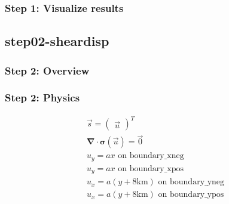 \documentclass[aspectratio=169]{beamer}
\begin{document}
\begin{frame}
  \frametitle{Step 1: Visualize results}

    
\end{frame}


\subsection{step02-sheardisp}

\begin{frame}
  \frametitle{Step 2: Overview}

      
\end{frame}


\begin{frame}[t]
  \frametitle{Step 2: Physics}
  \summary{}

  \begin{minipage}{0.35\textwidth}
    {\scriptsize
    \begin{gather*}
      \vec{s} = \left(\begin{array}{c} \vec{u} \end{array}\right)^T \\
      \boldsymbol{\nabla} \cdot \boldsymbol{\sigma}(\vec{u}) = \vec{0} \\
      u_y = ax \text{ on boundary\_xneg} \\
      u_y = ax \text{ on boundary\_xpos} \\
      u_x = a(y+8\mathrm{km}) \text{ on boundary\_yneg} \\
      u_x = a(y+8\mathrm{km}) \text{ on boundary\_ypos}
    \end{gather*}}
  \end{minipage}
  \hfill
  \begin{minipage}{0.55\textwidth}
  \end{minipage}
      
\end{frame}
\end{document}
